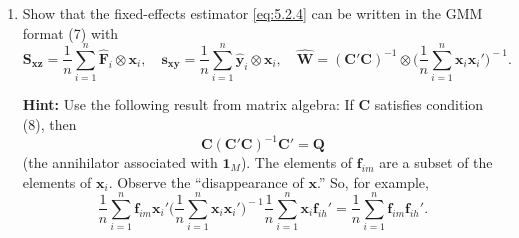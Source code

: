 \begin{problemset}
\begin{enumerate}[label=(\alph*)]
  \textbf{Hint:} For the orthogonality conditions, note that \eqref{eq:5.1.8b} can be written as
  $\E(\boldsymbol{\eta}_i \otimes \mathbf{x}_i) = \mathbf{0}$ and that
  $\hat{\boldsymbol{\eta}}_i \otimes \mathbf{x}_i = (\mathbf{C}' \otimes \mathbf{I}_K)(\boldsymbol{\eta}_i \otimes \mathbf{x}_i)$.
  The identification
  condition is equivalent to \eqref{eq:5.1.15} (see the answer sheet for proof). To show
  that $\E(\hat{\boldsymbol{\eta}}_i\hat{\boldsymbol{\eta}}_i' \mid \mathbf{x}_i)$ does not depend on
  $\mathbf{x}_i$, use the fact that $\hat{\boldsymbol{\eta}}_i = \mathbf{C}'\boldsymbol{\eta}_i = \mathbf{C}'\boldsymbol{\varepsilon}_i$
  since $\boldsymbol{\varepsilon}_i = \mathbf{1}_M \cdot \alpha_i + \boldsymbol{\eta}_i$. Given conditional homoskedasticity, we have
  \[
    \E(\hat{\mathbf{g}}_i\hat{\mathbf{g}}_i')
    = \E(\hat{\boldsymbol{\eta}}_i\hat{\boldsymbol{\eta}}_i') \otimes \E(\mathbf{x}_i\mathbf{x}_i').
  \]
  So the last condition (nonsingularity of $\E(\hat{\mathbf{g}}_i\hat{\mathbf{g}}_i')$) is simply that
  $\E(\mathbf{x}_i\mathbf{x}_i')$ be nonsingular.

\item Show that the fixed-effects estimator \eqref{eq:5.2.4} can be written in the GMM
  format (7) with
  \begin{equation}
    \mathbf{S}_{\mathbf{xz}} = \frac{1}{n}\sum_{i=1}^{n}\hat{\mathbf{F}}_i \otimes \mathbf{x}_i,
    \quad
    \mathbf{s}_{\mathbf{xy}} = \frac{1}{n}\sum_{i=1}^{n}\hat{\mathbf{y}}_i \otimes \mathbf{x}_i,
    \quad
    \hat{\mathbf{W}} = (\mathbf{C}'\mathbf{C})^{-1} \otimes
    \biggl(\frac{1}{n}\sum_{i=1}^{n}\mathbf{x}_i\mathbf{x}_i'\biggr)^{\!-1}.
    \tag{10}
  \end{equation}

  \textbf{Hint:} Use the following result from matrix algebra: If $\mathbf{C}$ satisfies condition
  (8), then
  \begin{equation}
    \mathbf{C}(\mathbf{C}'\mathbf{C})^{-1}\mathbf{C}' = \mathbf{Q} \tag{11}
  \end{equation}
  (the annihilator associated with $\mathbf{1}_M$). The elements of $\mathbf{f}_{im}$ are a subset of
  the elements of $\mathbf{x}_i$. Observe the ``disappearance of $\mathbf{x}$.'' So, for example,
  \[
    \frac{1}{n}\sum_{i=1}^{n}\mathbf{f}_{im}\mathbf{x}_i'
    \biggl(\frac{1}{n}\sum_{i=1}^{n}\mathbf{x}_i\mathbf{x}_i'\biggr)^{\!-1}
    \frac{1}{n}\sum_{i=1}^{n}\mathbf{x}_i\mathbf{f}_{ih}'
    = \frac{1}{n}\sum_{i=1}^{n}\mathbf{f}_{im}\mathbf{f}_{ih}'.
  \]


\end{enumerate}
\end{problemset}
